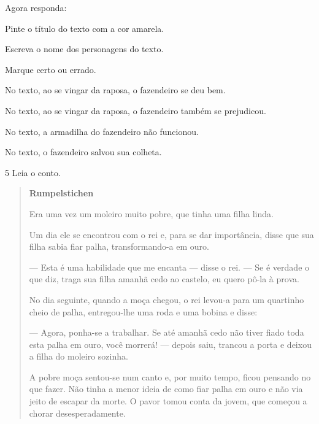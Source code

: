 Agora responda:

\begin{escolha}
\item Pinte o título do texto com a cor amarela.

\item Escreva o nome dos personagens do texto.


\item Marque certo ou errado.

\begin{boxlist}
 No texto, ao se vingar da raposa, o fazendeiro se deu bem.

 No texto, ao se vingar da raposa, o fazendeiro também se prejudicou.

 No texto, a armadilha do fazendeiro não funcionou.

 No texto, o fazendeiro salvou sua colheta.
\end{boxlist}
\end{escolha}

\num{5} Leia o conto.


\begin{quote}
\textbf{Rumpelstichen}

Era uma vez um moleiro muito pobre, que tinha uma filha linda.

Um dia ele se encontrou com o rei e, para se dar importância,
disse que sua filha sabia fiar palha, transformando-a em ouro.

--- Esta é uma habilidade que me encanta --- disse o
rei. --- Se é verdade o que diz, traga sua filha amanhã cedo ao
castelo, eu quero pô-la à prova.

No dia seguinte, quando a moça chegou, o rei levou-a
para um quartinho cheio de palha, entregou-lhe uma roda e uma
bobina e disse:

--- Agora, ponha-se a trabalhar. Se até amanhã cedo
não tiver fiado toda esta palha em ouro, você morrerá! ---
depois saiu, trancou a porta e deixou a filha do moleiro
sozinha.

A pobre moça sentou-se num canto e, por muito tempo,
ficou pensando no que fazer. Não tinha a menor ideia de como
fiar palha em ouro e não via jeito de escapar da morte. O
pavor tomou conta da jovem, que começou a chorar
desesperadamente.
\end{quote}


